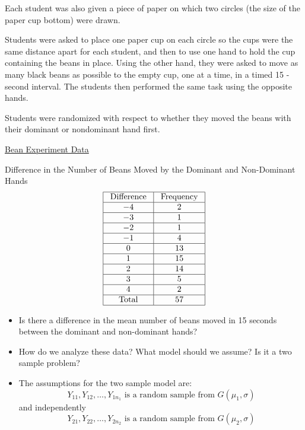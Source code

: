 Each student was also given a piece of paper on which two circles
(the size of the paper cup bottom) were drawn.

Students were asked to place one paper cup on each circle so the cups were the same distance
apart for each student, and then to use one hand to hold the cup containing the beans in place.
Using the other hand, they were asked to move as many black beans as possible to the empty
cup, one at a time, in a timed 15 -second interval. The students then performed the same
task using the opposite hands.

Students were randomized with respect to whether they moved the beans with
their dominant or nondominant hand first.

\underline{Bean Experiment Data}

Difference in the Number of Beans Moved by the Dominant and
Non-Dominant Hands
\[ \begin{array}{|c|c|}
        \hline
        \text { Difference } & \text { Frequency } \\
        \hline
        -4                   & 2                   \\
        \hline
        -3                   & 1                   \\
        \hline
        -2                   & 1                   \\
        \hline
        -1                   & 4                   \\
        \hline
        0                    & 13                  \\
        \hline
        1                    & 15                  \\
        \hline
        2                    & 14                  \\
        \hline
        3                    & 5                   \\
        \hline
        4                    & 2                   \\
        \hline
        \text { Total }      & 57                  \\
        \hline
    \end{array} \]
\begin{itemize}
    \item Is there a difference in the mean number of beans moved in 15 seconds between the dominant and non-dominant hands?
    \item How do we analyze these data? What model should we assume? Is it a two sample problem?
    \item The assumptions for the two sample model are:
          \[Y_{11}, Y_{12}, \ldots, Y_{1 n_{1}} \text{ is a random sample from } G\left(\mu_{1}, \sigma\right)\]
          and independently
          \[Y_{21}, Y_{22}, \ldots, Y_{2 n_{2}} \text{ is a random sample from } G\left(\mu_{2}, \sigma\right)\]
\end{itemize}

